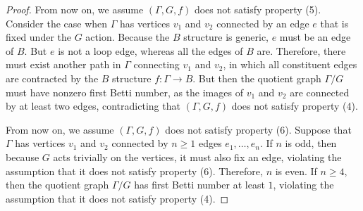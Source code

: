 \documentclass[12pt]{amsart}
\theoremstyle{definition}
\begin{document}
\begin{proof}
    From now on, we assume $(\Gamma,G,f)$ does not satisfy property (5). Consider the case when $\Gamma$ has vertices $v_1$ and $v_2$ connected by an edge $e$ that is fixed under the $G$ action. Because the $B$ structure is generic, $e$ must be an edge of $B$. But $e$ is not a loop edge, whereas all the edges of $B$ are. Therefore, there must exist another path in $\Gamma$ connecting $v_1$ and $v_2$, in which all constituent edges are contracted by the $B$ structure $f:\Gamma\rightarrow B$. But then the quotient graph $\Gamma/G$ must have nonzero first Betti number, as the images of $v_1$ and $v_2$ are connected by at least two edges, contradicting that $(\Gamma,G,f)$ does not satisfy property (4).

    
    From now on, we assume $(\Gamma,G,f)$ does not satisfy property (6). Suppose that $\Gamma$ has vertices $v_1$ and $v_2$ connected by $n\geq 1$ edges $e_1,\dots,e_n$. If $n$ is odd, then because $G$ acts trivially on the vertices, it must also fix an edge, violating the assumption that it does not satisfy property (6). Therefore, $n$ is even. If $n\geq 4$, then the quotient graph $\Gamma/G$ has first Betti number at least $1$, violating the assumption that it does not satisfy property (4).

\end{proof}
\end{document}
